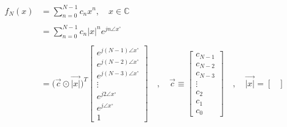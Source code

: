 \documentclass{article}
\begin{document}
\begin{align*}
    f_{N}(x)&= \sum^{N - 1}_{n = 0}c_{n}x^{n}, \quad x \in \mathbb{C} \\ \\
            &= \sum^{N - 1}_{n = 0}c_{n}|x|^{n}e^{jn\angle{x}^{\circ}} \\ \\
            &= \Big(\vec{c} \odot \vec{|x|}\Big)^{T}\begin{bmatrix}
                                                        e^{j(N - 1)\angle{x}^{\circ}} \\
                                                        e^{j(N - 2)\angle{x}^{\circ}} \\
                                                        e^{j(N - 3)\angle{x}^{\circ}} \\
                                                        \vdots \\
                                                        e^{j2\angle{x}^{\circ}} \\
                                                        e^{j\angle{x}^{\circ}} \\
                                                        1
                                                      \end{bmatrix} \quad , \quad \vec{c} \equiv \begin{bmatrix}
                                                                                                    c_{N - 1} \\
                                                                                                    c_{N - 2} \\
                                                                                                    c_{N - 3} \\
                                                                                                    \vdots \\
                                                                                                    c_{2} \\
                                                                                                    c_{1} \\
                                                                                                    c_{0}
                                                                                                  \end{bmatrix} \quad , \quad \vec{|x|} = \begin{bmatrix}

\end{bmatrix}
\end{align*}
\end{document}
